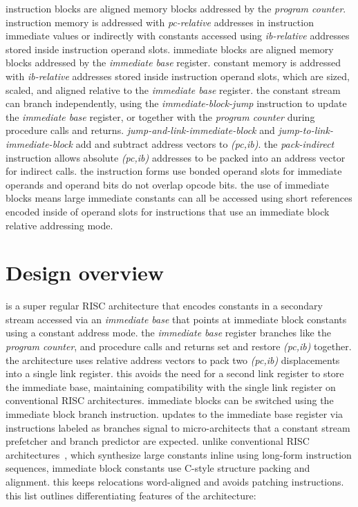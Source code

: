 \par\noindent
instruction blocks are aligned memory blocks addressed by the \emph{program
counter}. instruction memory is addressed with \emph{pc-relative} addresses
in instruction immediate values or indirectly with constants accessed using
\emph{ib-relative} addresses stored inside instruction operand slots.
\para
immediate blocks are aligned memory blocks addressed by the \emph{immediate
base} register. constant memory is addressed with \emph{ib-relative}
addresses stored inside instruction operand slots, which are sized, scaled,
and aligned relative to the \emph{immediate base} register.
\para
the constant stream can branch independently, using the
\emph{immediate-block-jump} instruction to update the \emph{immediate base}
register, or together with the \emph{program counter} during procedure calls
and returns.
\emph{jump-and-link-immediate-block} and \emph{jump-to-link-immediate-block}
add and subtract address vectors to \emph{(pc,ib)}. the \emph{pack-indirect}
instruction allows absolute \emph{(pc,ib)} addresses to be packed into an
address vector for indirect calls.
\para
the instruction forms use bonded operand slots for immediate operands and
operand bits do not overlap opcode bits. the use of immediate blocks means
large immediate constants can all be accessed using short references encoded
inside of operand slots for instructions that use an immediate block
relative addressing mode.
\\

\newpage
\section{Design overview}

\par\noindent
\arch{} is a super regular RISC architecture that encodes constants in a
secondary stream accessed via an \emph{immediate base} that points at
immediate block constants using a constant address mode.
the \emph{immediate base} register branches like the \emph{program counter},
and procedure calls and returns set and restore \emph{(pc,ib)} together.
\para
the architecture uses relative address vectors to pack two \emph{(pc,ib)}
displacements into a single link register. this avoids the need for a
second link register to store the immediate base, maintaining compatibility
with the single link register on conventional RISC architectures.
\para
immediate blocks can be switched using the immediate block branch instruction.
updates to the immediate base register via instructions labeled as branches
signal to micro-architects that a constant stream prefetcher and branch
predictor are expected.
unlike conventional RISC architectures~\cite{patterson1981risc,hennessy1981mips,waterman2016riscv},
which synthesize large constants inline
using long-form instruction sequences, immediate block constants use C-style
structure packing and alignment. this keeps relocations word-aligned
and avoids patching instructions.
\para
this list outlines differentiating features of the architecture:

